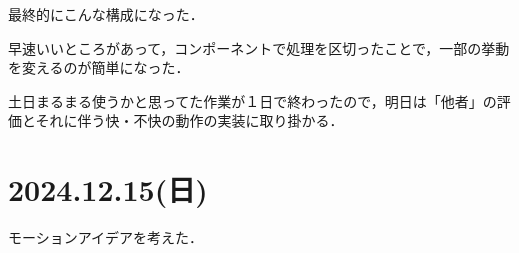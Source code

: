 \documentclass[fleqn,twocolumn]{mynote}
\begin{document}
  最終的にこんな構成になった．

  \fboxsep=0pt            %
  \fboxrule=1pt            %
  \begin{figure}[h]
    \centering
    \caption{}
    \label{fig:}
  \end{figure}

  早速いいところがあって，コンポーネントで処理を区切ったことで，一部の挙動を変えるのが簡単になった．

  土日まるまる使うかと思ってた作業が１日で終わったので，明日は「他者」の評価とそれに伴う快・不快の動作の実装に取り掛かる．

  \section*{2024.12.15(日)}
  モーションアイデアを考えた．

  \fboxsep=0pt            %
  \fboxrule=1pt            %
  \begin{figure}[h]
    \centering
    \caption{}
    \label{fig:}
  \end{figure}
\end{document}
